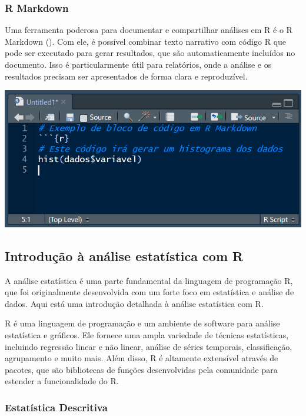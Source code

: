\documentclass[
]{book}
\begin{document}
\subsubsection{R Markdown}\label{r-markdown}

Uma ferramenta poderosa para documentar e compartilhar análises em R é o R Markdown (). Com ele, é possível combinar texto narrativo com código R que pode ser executado para gerar resultados, que são automaticamente incluídos no documento. Isso é particularmente útil para relatórios, onde a análise e os resultados precisam ser apresentados de forma clara e reproduzível.

\includegraphics{images/clipboard-1117062658.png}

\subsection{Introdução à análise estatística com R}\label{introduuxe7uxe3o-uxe0-anuxe1lise-estatuxedstica-com-r}

A análise estatística é uma parte fundamental da linguagem de programação R, que foi originalmente desenvolvida com um forte foco em estatística e análise de dados. Aqui está uma introdução detalhada à análise estatística com R.

R é uma linguagem de programação e um ambiente de software para análise estatística e gráficos. Ele fornece uma ampla variedade de técnicas estatísticas, incluindo regressão linear e não linear, análise de séries temporais, classificação, agrupamento e muito mais. Além disso, R é altamente extensível através de pacotes, que são bibliotecas de funções desenvolvidas pela comunidade para estender a funcionalidade do R.

\subsubsection{Estatística Descritiva}\label{estatuxedstica-descritiva}
\end{document}
